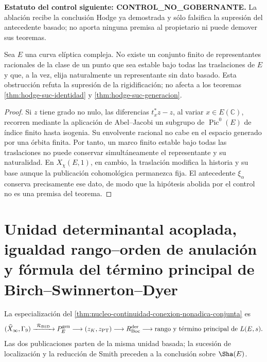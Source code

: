 

\noindent\textbf{Estatuto del control siguiente: CONTROL\_NO\_GOBERNANTE.}
La ablación recibe la conclusión Hodge ya demostrada y sólo falsifica la
supresión del antecedente basado; no aporta ninguna premisa al propietario ni
puede demover sus teoremas.

\begin{ablation}
\label{abl:hodge-suc-eliptico}
Sea \(E\) una curva elíptica compleja. No existe un conjunto finito de
representantes racionales de la clase de un punto que sea estable bajo todas
las traslaciones de \(E\) y que, a la vez, elija naturalmente un
representante sin dato basado. Esta obstrucción refuta la supresión de la
rigidificación; no afecta a los teoremas
\ref{thm:hodge-suc-identidad} y \ref{thm:hodge-suc-generacion}.
\end{ablation}

\begin{proof}
Si \(z\) tiene grado no nulo, las diferencias
\(t_x^{*}z-z\), al variar \(x\in E(\mathbb C)\), recorren mediante la
aplicación de Abel--Jacobi un subgrupo de \(\operatorname{Pic}^{0}(E)\) de
índice finito hasta isogenia. Su envolvente racional no cabe en el espacio
generado por una órbita finita. Por tanto, un marco finito estable bajo todas
las traslaciones no puede conservar simultáneamente el representante y su
naturalidad. En \(X_{\chi}(E,1)\), en cambio, la traslación modifica la
historia y su base aunque la publicación cohomológica permanezca fija. El
antecedente \(\xi_{\alpha}\) conserva precisamente ese dato, de modo que la
hipótesis abolida por el control no es una premisa del teorema.
\end{proof}
\chapter{Unidad determinantal acoplada, igualdad rango--orden de anulación y fórmula del término principal de Birch--Swinnerton--Dyer}

\noindent La especialización del
\cref{thm:nucleo-continuidad-conexion-nonadica-conjunta} es
\[
 (\widehat X_\infty,\Gamma_9)
 \xrightarrow{\ \mathcal R_{\rm BSD}\ }
 P_E^{\rm gen}
 \longrightarrow(z_K,z_{\rm PT})
 \longrightarrow R_{\rm Boc}^{\rm der}
 \longrightarrow\text{rango y término principal de }L(E,s).
\]
Las dos publicaciones parten de la misma unidad basada; la sucesión de
localización y la reducción de Smith preceden a la conclusión sobre
\(\Sha(E)\).

